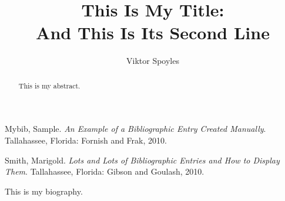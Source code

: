 \documentclass[11pt,expanded,copyright]{fsuthesis}
\title{This Is My Title:\protect\\And This Is Its Second Line}
\author{Viktor Spoyles}
\begin{document}
\frontmatter
\maketitle
\makecommitteepage



\tableofcontents



\begin{abstract}
This is my abstract.
\end{abstract}

\mainmatter


%
%

%


\begin{references}
Mybib, Sample. \textit{An Example of a Bibliographic Entry
 Created Manually}. Tallahassee, Florida: Fornish and Frak, 2010.

Smith, Marigold. \textit{Lots and Lots of Bibliographic Entries
 and How to Display Them}. Tallahassee, Florida: Gibson and Goulash, 2010.
\end{references}


% 
% 

\begin{biosketch}
This is my biography.
\end{biosketch}
\end{document}
